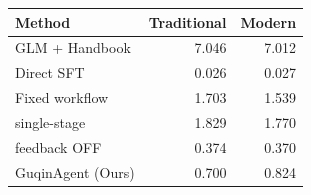 \begin{tabularx}{\linewidth}{@{}Xrr@{}}
\toprule
Method & Traditional & Modern \\
\midrule
GLM + Handbook & 7.046 & 7.012 \\
Direct SFT & 0.026 & 0.027 \\
Fixed workflow & 1.703 & 1.539 \\
single-stage & 1.829 & 1.770 \\
feedback OFF & 0.374 & 0.370 \\
GuqinAgent (Ours) & 0.700 & 0.824 \\
\bottomrule
\end{tabularx}
